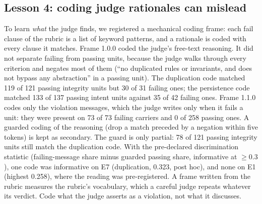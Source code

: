 \documentclass[10pt,a4paper]{article}
\begin{document}
\subsection{Lesson 4: coding judge rationales can mislead}\label{sec:l4}

To learn \emph{what} the judge finds, we registered a mechanical coding frame: each fail clause of the rubric is a
list of keyword patterns, and a rationale is coded with every clause it matches.
Frame 1.0.0 coded the judge's free-text reasoning. It did not separate failing from passing units, because the judge
walks through every criterion and negates most of them (``no duplicated rules or invariants, and does not bypass any
abstraction'' in a passing unit). The duplication code matched 119 of 121 passing integrity units but 30 of 31
failing ones; the persistence code matched 133 of 137 passing intent units against 35 of 42 failing ones.
Frame 1.1.0 codes only the violation messages, which the judge writes only when it fails a unit: they were present
on 73 of 73 failing carriers and 0 of 258 passing ones. A guarded coding of the reasoning (drop a match preceded by
a negation within five tokens) is kept as secondary.
The guard is only partial: 78 of 121 passing integrity units still match the duplication code. With the
pre-declared discrimination statistic (failing-message share minus guarded passing share, informative at
$\geq 0.3$), one code was informative on E7 (duplication, 0.323, post hoc), and none on E1 (highest 0.258), where the
reading was pre-registered.
A frame written from the rubric measures the rubric's vocabulary, which a careful judge repeats whatever its
verdict. Code what the judge asserts as a violation, not what it discusses.
\end{document}
